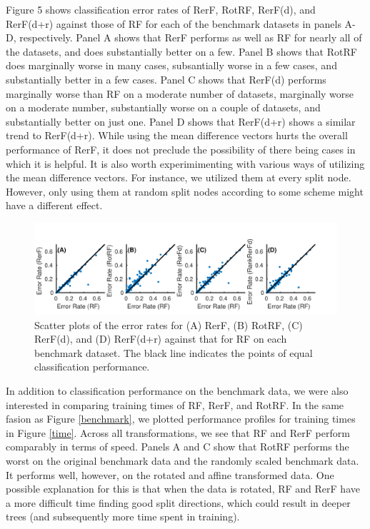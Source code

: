 \documentclass{article}
\begin{document}
Figure 5 shows classification error rates of RerF, RotRF, RerF(d), and RerF(d+r) against those of RF for each of the benchmark datasets in panels A-D, respectively. Panel A shows that RerF performs as well as RF for nearly all of the datasets, and does substantially better on a few. Panel B shows that RotRF does marginally worse in many cases, subsantially worse in a few cases, and substantially better in a few cases. Panel C shows that RerF(d) performs marginally worse than RF on a moderate number of datasets, marginally worse on a moderate number, substantially worse on a couple of datasets, and substantially better on just one. Panel D shows that RerF(d+r) shows a similar trend to RerF(d+r). While using the mean difference vectors hurts the overall performance of RerF, it does not preclude the possibility of there being cases in which it is helpful. It is also worth experimimenting with various ways of utilizing the mean difference vectors. For instance, we utilized them at every split node. However, only using them at random split nodes according to some scheme might have a different effect.

\begin{figure}[ht]
\vskip 0.2in
\begin{center}
\centerline{\includegraphics[width=\columnwidth]{../Figures/pdf/Fig5_benchmark_scatter}}
\caption{Scatter plots of the error rates for (A) RerF, (B) RotRF, (C) RerF(d), and (D) RerF(d+r) against that for RF on each benchmark dataset. The black line indicates the points of equal classification performance.}
\label{scatter}
\end{center}
\vskip -0.2in
\end{figure}

In addition to classification performance on the benchmark data, we were also interested in comparing training times of RF, RerF, and RotRF. In the same fasion as Figure \ref{benchmark}, we plotted performance profiles for training times in Figure \ref{time}. Across all transformations, we see that RF and RerF perform comparably in terms of speed. Panels A and C show that RotRF performs the worst on the original benchmark data and the randomly scaled benchmark data. It performs well, however, on the rotated and affine transformed data. One possible explanation for this is that when the data is rotated, RF and RerF have a more difficult time finding good split directions, which could result in deeper trees (and subsequently more time spent in training). 
\end{document}
